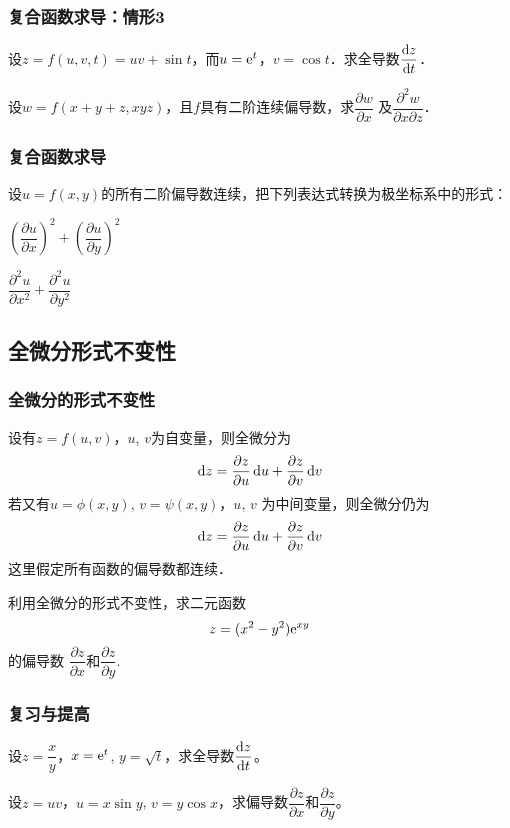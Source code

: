 \documentclass[14pt,notheorems,leqno,xcolor={rgb}]{beamer} %
\begin{document}
\begin{frame}
\frametitle{复合函数求导：情形3}
\begin{example}
设$z=f(u,v,t)=uv+\sin t$，而$u=\mathrm{e}^t$，$v=\cos t$．求全导数$\dfrac{\mathop{}\!\mathrm{d} z}{\mathop{}\!\mathrm{d} t}$．
\end{example}
\vpause
\begin{example}
设$w=f(x+y+z,xyz)$，且$f$具有二阶连续偏导数，求$\dfrac{\partial w}{\partial x}$
及$\dfrac{\partial^2 w}{\partial x\partial z}$．
\end{example}
\end{frame}

\begin{iframe}
\frametitle{复合函数求导}
\begin{example}
设$u=f(x,y)$的所有二阶偏导数连续，把下列表达式转换为极坐标系中的形式：
\begin{enumhalf}
  \item $\left(\dfrac{\partial u}{\partial x}\right)^2+\left(\dfrac{\partial u}{\partial y}\right)^2$ ~
  \item $\dfrac{\partial^2 u}{\partial x^2}+\dfrac{\partial^2 u}{\partial y^2}$ ~
\end{enumhalf}
\end{example}
\end{iframe}

\subsection{全微分形式不变性}

\begin{frame}
\frametitle{全微分的形式不变性}
设有$z=f(u,v)$，$u$, $v$为自变量，则全微分为
$$\mathop{}\!\mathrm{d}{z}=\frac{\partial z}{\partial u}\mathop{}\!\mathrm{d}{u}+\frac{\partial z}{\partial v}\mathop{}\!\mathrm{d}{v}$$
\pause
若又有$u=\phi(x,y)$, $v=\psi(x,y)$，$u$, $v$ 为中间变量，则全微分仍为
$$\mathop{}\!\mathrm{d}{z}=\frac{\partial z}{\partial u}\mathop{}\!\mathrm{d}{u}+\frac{\partial z}{\partial v}\mathop{}\!\mathrm{d}{v}$$
这里假定所有函数的偏导数都连续．
\end{frame}

\begin{frame}
\begin{example}
利用全微分的形式不变性，求二元函数$$z=(x^2-y^2)\mathrm{e}^{xy}$$的偏导数
$\dfrac{\partial z}{\partial x}$和$\dfrac{\partial z}{\partial y}$.
\end{example}
\end{frame}


\begin{frame}
\frametitle{复习与提高}
\begin{review}
\begin{enumlite}
  \item 设$z=\dfrac{x}y$，$x=\mathrm{e}^t$, $y=\sqrt{t}$，求全导数$\dfrac{\mathop{}\!\mathrm{d} z}{\mathop{}\!\mathrm{d} t}$。
  \item 设$z=uv$，$u=x\sin y$, $v=y\cos x$，求偏导数$\dfrac{\partial z}{\partial x}$和$\dfrac{\partial z}{\partial y}$。
\end{enumlite}
\end{review}
\end{frame}
\end{document}
